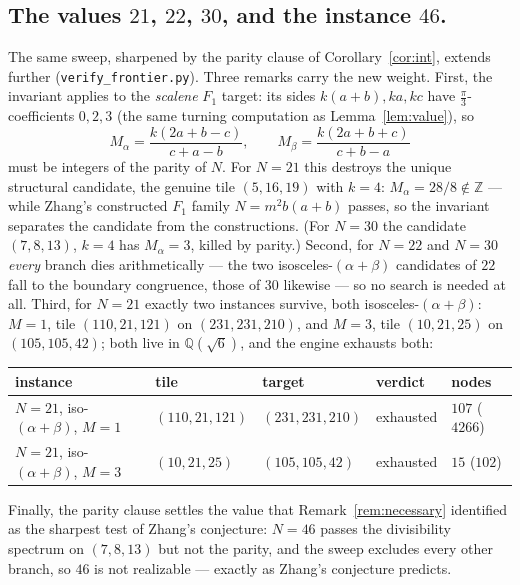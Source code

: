 \documentclass[11pt,reqno]{amsart}
\theoremstyle{plain}
\theoremstyle{definition}
\newcommand{\Z}{\mathbb{Z}}
\newcommand{\Q}{\mathbb{Q}}
\begin{document}
\subsection*{The values $21$, $22$, $30$, and the instance $46$.}
The same sweep, sharpened by the parity clause of Corollary~\ref{cor:int}, extends further
(\texttt{verify\_frontier.py}). Three remarks carry the new weight. First, the invariant
applies to the \emph{scalene} $F_1$ target: its sides $k(a{+}b),ka,kc$ have
$\frac\pi3$-coefficients $0,2,3$ (the same turning computation as Lemma~\ref{lem:value}), so
\[
M_\alpha=\frac{k(2a+b-c)}{c+a-b},\qquad M_\beta=\frac{k(2a+b+c)}{c+b-a}
\]
must be integers of the parity of $N$. For $N=21$ this destroys the unique structural candidate,
the genuine tile $(5,16,19)$ with $k=4$: $M_\alpha=28/8\notin\Z$ --- while Zhang's constructed
$F_1$ family $N=m^2b(a+b)$ passes, so the invariant separates the candidate from the constructions.
(For $N=30$ the candidate $(7,8,13)$, $k=4$ has $M_\alpha=3$, killed by parity.) Second, for
$N=22$ and $N=30$ \emph{every} branch dies arithmetically --- the two isosceles-$(\alpha{+}\beta)$
candidates of $22$ fall to the boundary congruence, those of $30$ likewise --- so no search is
needed at all. Third, for $N=21$ exactly two instances survive, both isosceles-$(\alpha{+}\beta)$:
$M=1$, tile $(110,21,121)$ on $(231,231,210)$, and $M=3$, tile $(10,21,25)$ on $(105,105,42)$;
both live in $\Q(\sqrt6)$, and the engine exhausts both:
\begin{center}
\begin{tabular}{lllll}
instance & tile & target & verdict & nodes\\
\hline
$N{=}21$, iso-$(\alpha{+}\beta)$, $M{=}1$ & $(110,21,121)$ & $(231,231,210)$ & exhausted & $107$ ($4266$)\\
$N{=}21$, iso-$(\alpha{+}\beta)$, $M{=}3$ & $(10,21,25)$ & $(105,105,42)$ & exhausted & $15$ ($102$)\\
\end{tabular}
\end{center}
Finally, the parity clause settles the value that Remark~\ref{rem:necessary} identified as the
sharpest test of Zhang's conjecture: $N=46$ passes the divisibility spectrum on $(7,8,13)$ but not
the parity, and the sweep excludes every other branch, so $46$ is not realizable --- exactly as
Zhang's conjecture predicts.
\end{document}
